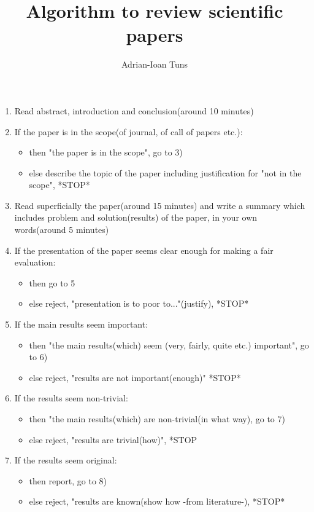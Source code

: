 \documentclass[]{article}
\title{Algorithm to review scientific papers}
\date{}
\author{Adrian-Ioan Tuns}
\affil{Departament of computer science

Faculty of Mathematics and Informatics

West University of Timișoara

Teacher: Adrian Craciun

Email: tunsadrian99@gmail.com}
\begin{document}
	
\maketitle
\bigskip

\begin{enumerate}


\item Read abstract, introduction and conclusion(around 10 minutes)

\item If the paper is in the scope(of journal, of call of papers etc.):
\begin{itemize}
\item then "the paper is in the scope", go to 3)
\item else describe the topic of the paper including justification for "not in the scope", *STOP*
\end{itemize}

\item Read superficially the paper(around 15 minutes) and write a summary which includes problem and solution(results) of the paper, in your own words(around 5 minutes)

\item If the presentation of the paper seems clear enough for making a fair evaluation:
\begin{itemize}
\item then go to 5
\item else reject, "presentation is to poor to..."(justify), *STOP*
\end{itemize}

\item If the main results seem important:
\begin{itemize}
\item then "the main results(which) seem (very, fairly, quite etc.) important", go to 6)
\item else reject, "results are not important(enough)" *STOP*
\end{itemize}

\item If the results seem non-trivial:
\begin{itemize}
\item then "the main results(which) are non-trivial(in what way), go to 7)
\item else reject, "results are trivial(how)", *STOP
\end{itemize}

\item If the results seem original:
\begin{itemize}
\item then report, go to 8)
\item else reject, "results are known(show how -from literature-), *STOP*
\end{itemize}


\end{enumerate}
\end{document}
